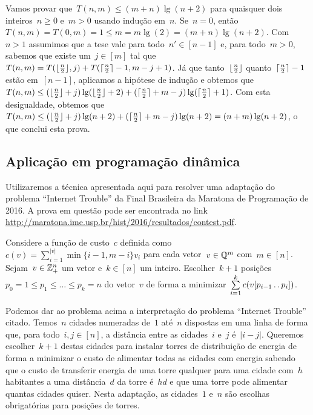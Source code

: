 Vamos provar que~$T(n,m) \leq (m+n)\lg(n + 2)$ para quaisquer dois inteiros~${ n \geq 0 }$ e~$m > 0$ usando indução em~$n$. Se~${ n = 0 }$, então~${ T(n,m) = T(0,m) = 1 \leq m = m\lg(2) =  (m + n)\lg(n+2) }$. Com~${ n > 1 }$ assumimos que a tese vale para todo~${ n' \in [n-1] }$ e, para todo~$m > 0$, sabemos que existe um~${ j \in [m] }$ tal que~${ T(n,m) = T(\lfloor \frac{n}{2} \rfloor,j) + T(\lceil \frac{n}{2} \rceil - 1, m - j + 1) }$. Já que tanto~$\lfloor \frac{n}{2} \rfloor$ quanto~$\lceil \frac{n}{2} \rceil - 1$ estão em~$[n-1]$, aplicamos a hipótese de indução e obtemos que~${ T(n,m) \leq (\lfloor \frac{n}{2} \rfloor + j)\lg(\lfloor \frac{n}{2} \rfloor + 2) + (\lceil \frac{n}{2} \rceil + m - j)\lg(\lceil \frac{n}{2} \rceil + 1) }$. Com esta desigualdade, obtemos que~${ T(n,m) \leq (\lfloor \frac{n}{2} \rfloor + j)\lg(n + 2) + (\lceil \frac{n}{2} \rceil + m - j)\lg(n + 2) = (n + m)\lg(n+2) }$, o que conclui esta prova.

\subsection{Aplicação em programação dinâmica} \label{DivConq:DP}
Utilizaremos a técnica apresentada aqui para resolver uma adaptação do problema ``Internet Trouble'' da Final Brasileira da Maratona de Programação de 2016. A prova em questão pode ser encontrada no link \url{http://maratona.ime.usp.br/hist/2016/resultados/contest.pdf}.  

\begin{prob} \label{DivConq:InternetTrouble}
Considere a função de custo~$c$ definida como~${ c(v) = \sum\limits_{i=1}^{|v|} \min\{i-1,m-i\} v_i }$ para cada vetor~${ v \in \mathbb{Q}^m }$ com~${ m \in [n] }$. Sejam~${ v \in \mathbb{Z}_+^n }$ um vetor e~$k \in [n]$ um inteiro. Escolher~$k+1$ posições~${ p_0 = 1 \leq p_1 \leq \dots \leq p_k = n }$ do vetor~$v$ de forma a minimizar~${ \sum\limits_{ i = 1 }^k c(v[p_{i-1} \,.\,.\, p_i]) }$.
\end{prob}

Podemos dar ao problema acima a interpretação do problema ``Internet Trouble'' citado. Temos~$n$ cidades numeradas de~$1$ até~$n$ dispostas em uma linha de forma que, para todo~$i,j \in [n]$, a distância entre as cidades~$i$ e~$j$ é~$|i-j|$. Queremos escolher~${ k + 1 }$ destas cidades para instalar torres de distribuição de energia de forma a minimizar o custo de alimentar todas as cidades com energia sabendo que o custo de transferir energia de uma torre qualquer para uma cidade com~$h$ habitantes a uma distância~$d$ da torre é~$hd$ e que uma torre pode alimentar quantas cidades quiser. Nesta adaptação, as cidades~$1$ e~$n$ são escolhas obrigatórias para posições de torres. 

